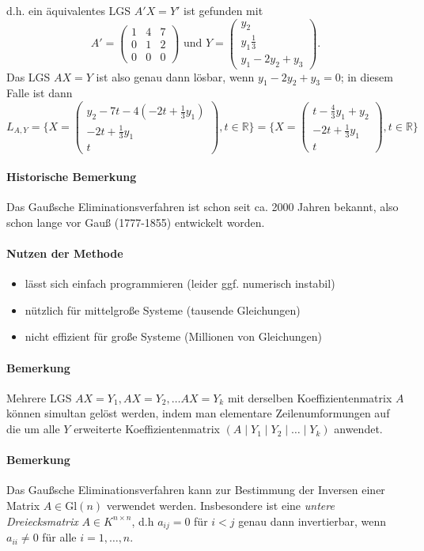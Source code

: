  		d.h. ein äquivalentes LGS $ A'X=Y' $ ist gefunden mit
 		\[
 			A' =
 			\begin{pmatrix}
 				1 & 4 & 7 \\
 				0 & 1 & 2 \\
 				0 & 0 & 0
 			\end{pmatrix}
 			\text{ und }
 			Y =
 			\begin{pmatrix}
 				y_2 \\ y_1\frac{1}{3} \\ y_1-2y_2+y_3
 			\end{pmatrix}
 			.
 		\]
 		Das LGS $ AX=Y $ ist also genau dann lösbar, wenn $ y_1-2y_2+y_3 = 0 $; in diesem Falle ist dann
 		\[
 			L_{A,Y} = \{X =
 			\begin{pmatrix} y_2-7t-4(-2t+\frac{1}{3}y_1)\\-2t+\frac{1}{3}y_1\\t\end{pmatrix}
 			, t\in \mathbb{R}\}
 			= \{X =
 			\begin{pmatrix} t-\frac{4}{3}y_1+y_2\\-2t+\frac{1}{3}y_1\\t\end{pmatrix}
 			, t\in \mathbb{R}\}
 		\]
 	\paragraph{Historische Bemerkung}
 		Das Gaußsche Eliminationsverfahren ist schon seit ca. 2000 Jahren bekannt, also schon lange vor Gauß (1777-1855) entwickelt worden.

 	\paragraph{Nutzen der Methode}
 		\begin{itemize}
 			\item lässt sich einfach programmieren (leider ggf. numerisch instabil)
 			\item nützlich für mittelgroße Systeme (tausende Gleichungen)
 			\item nicht effizient für große Systeme (Millionen von Gleichungen)
 		\end{itemize}
 	\paragraph{Bemerkung}
 		Mehrere LGS $ AX = Y_1, AX = Y_2, \dots AX = Y_k $ mit derselben Koeffizientenmatrix $ A $ können simultan gelöst werden, indem man elementare Zeilenumformungen auf die um alle $ Y $ erweiterte Koeffizientenmatrix $ (A\mid Y_1\mid Y_2\mid \dots \mid Y_k) $ anwendet.
 	\paragraph{Bemerkung}
 		Das Gaußsche Eliminationsverfahren kann zur Bestimmung der Inversen einer Matrix $ A\in \mathrm{Gl}(n) $ verwendet werden. Insbesondere ist eine \emph{untere Dreiecksmatrix} $ A\in K^{n\times n} $, d.h $ a_{ij} = 0 $ für $ i<j $ genau dann invertierbar, wenn $ a_{ii}\neq 0 $ für alle $ i=1,\dots,n $.
